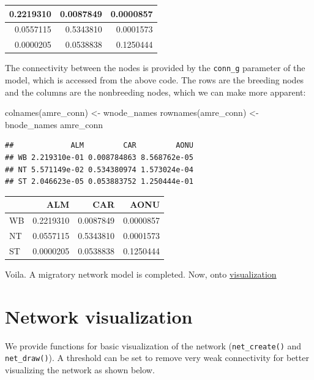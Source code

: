 \documentclass[
]{book}
\newenvironment{Shaded}{\begin{snugshade}}{\end{snugshade}}
\newcommand{\FunctionTok}[1]{\textcolor[rgb]{0.00,0.00,0.00}{#1}}
\newcommand{\NormalTok}[1]{#1}
\newcommand{\OtherTok}[1]{\textcolor[rgb]{0.56,0.35,0.01}{#1}}
\begin{document}
\begin{tabular}{r|r|r}
\hline
0.2219310 & 0.0087849 & 0.0000857\\
\hline
0.0557115 & 0.5343810 & 0.0001573\\
\hline
0.0000205 & 0.0538838 & 0.1250444\\
\hline
\end{tabular}

The connectivity between the nodes is provided by the \texttt{conn\_g} parameter of the model, which is accessed from the above code. The rows are the breeding nodes and the columns are the nonbreeding nodes, which we can make more apparent:

\begin{Shaded}
\begin{Highlighting}[]
\FunctionTok{colnames}\NormalTok{(amre\_conn) }\OtherTok{\textless{}{-}}\NormalTok{ wnode\_names}
\FunctionTok{rownames}\NormalTok{(amre\_conn) }\OtherTok{\textless{}{-}}\NormalTok{ bnode\_names}
\NormalTok{amre\_conn}
\end{Highlighting}
\end{Shaded}

\begin{verbatim}
##             ALM         CAR         AONU
## WB 2.219310e-01 0.008784863 8.568762e-05
## NT 5.571149e-02 0.534380974 1.573024e-04
## ST 2.046623e-05 0.053883752 1.250444e-01
\end{verbatim}

\begin{tabular}{l|r|r|r}
\hline
  & ALM & CAR & AONU\\
\hline
WB & 0.2219310 & 0.0087849 & 0.0000857\\
\hline
NT & 0.0557115 & 0.5343810 & 0.0001573\\
\hline
ST & 0.0000205 & 0.0538838 & 0.1250444\\
\hline
\end{tabular}

Voila. A migratory network model is completed. Now, onto \protect\hyperlink{visualization}{visualization}

\hypertarget{visualization}{%
\chapter{Network visualization}\label{visualization}}

We provide functions for basic visualization of the network (\texttt{net\_create()} and \texttt{net\_draw()}). A threshold can be set to remove very weak connectivity for better visualizing the network as shown below.
\end{document}
